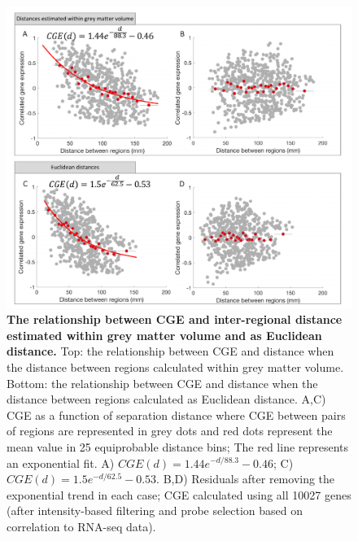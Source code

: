 \begin{figure}[h!]
\label{fig:Ch4Sfig7}
\end{figure}

\begin{figure}[h!]
  \centering
    \includegraphics[width=1\textwidth]{Chapter4/FigureS8.pdf}
\caption{\textbf{The relationship between CGE and inter-regional distance estimated within grey matter volume and as Euclidean distance.}
Top: the relationship between CGE and distance when the distance between regions calculated within grey matter volume. Bottom: the relationship between CGE and distance when the distance between regions calculated as Euclidean distance. A,C) CGE as a function of separation distance where CGE between pairs of regions are represented in grey dots and red dots represent the mean value in 25 equiprobable distance bins; The red line represents an exponential fit. A) $CGE(d) = 1.44e^{-d/88.3}-0.46$; C) $CGE(d)=1.5e^{-d/62.5}-0.53$.
B,D) Residuals after removing the exponential trend in each case;
CGE calculated using all \num{10027} genes (after intensity-based filtering and probe selection based on correlation to RNA-seq data). }
\label{fig:Ch4Sfig8}
\end{figure}

